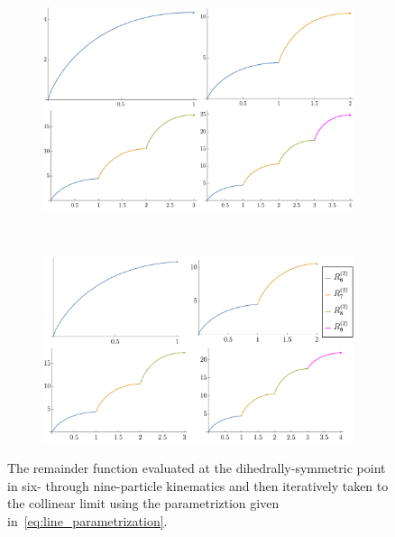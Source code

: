 \documentclass[11pt]{article}
\begin{document}
\begin{figure}[t]
\captionsetup[subfigure]{labelformat=empty}
\begin{center}
  \begin{subfigure}[b]{0.85\textwidth}
    \includegraphics[width=\textwidth]{symmetric_lines.pdf}
  \end{subfigure}
\  %
  \begin{subfigure}[t]{0.1\textwidth} \vspace{-7cm}
    \includegraphics[width=\textwidth]{symmetric_lines_label.pdf}
  \end{subfigure}
    \caption{The remainder function evaluated at the dihedrally-symmetric point in six- through nine-particle kinematics and then iteratively taken to the collinear limit using the parametriztion given in~\eqref{eq:line_parametrization}.}
    \label{fig:symm_to_collinear_lines}
\end{center}
\end{figure}
\end{document}
